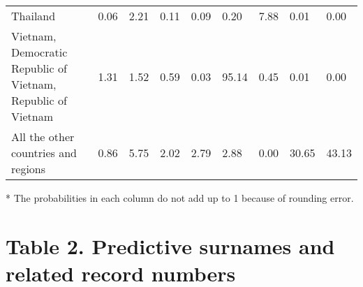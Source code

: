 \documentclass[
  landscape]{article}
\begin{document}
\begin{table}[!h]
\begin{threeparttable}
\begin{tabular}[t]{>{\raggedright\arraybackslash}p{5cm}llllllll}
Thailand & 0.06 & 2.21 & 0.11 & 0.09 & 0.20 & 7.88 & 0.01 & 0.00\\
Vietnam, Democratic Republic of Vietnam, Republic of Vietnam & 1.31 & 1.52 & 0.59 & 0.03 & 95.14 & 0.45 & 0.01 & 0.00\\
All the other countries and regions & 0.86 & 5.75 & 2.02 & 2.79 & 2.88 & 0.00 & 30.65 & 43.13\\
\bottomrule
\end{tabular}
\begin{tablenotes}
\small
\item [*] The probabilities in each column do not add up to 1 because of rounding error.
\end{tablenotes}
\end{threeparttable}
\end{table}

\newpage

\hypertarget{table-2.-predictive-surnames-and-related-record-numbers}{%
\section{Table 2. Predictive surnames and related record
numbers}\label{table-2.-predictive-surnames-and-related-record-numbers}}
\end{document}

